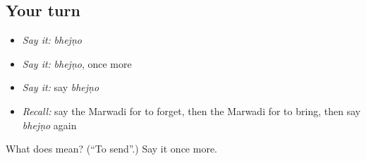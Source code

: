 \subsection*{Your turn}
\begin{itemize}
\raggedright
  \item \emph{Say it:} \emph{bhejṇo}
  \item \emph{Say it:} \emph{bhejṇo}, once more
  \item \emph{Say it:} say \emph{bhejṇo}
  \item \emph{Recall:} say the Marwadi for to forget, then the Marwadi for to bring, then say \emph{bhejṇo} again
\end{itemize}

\begin{tcolorbox}[breakable,colback=teal!4,colframe=teal!35!black,title={Before you move on}]
What does  mean? (\textquotedblleft{}To send\textquotedblright{}.) Say it once more.
\end{tcolorbox}
